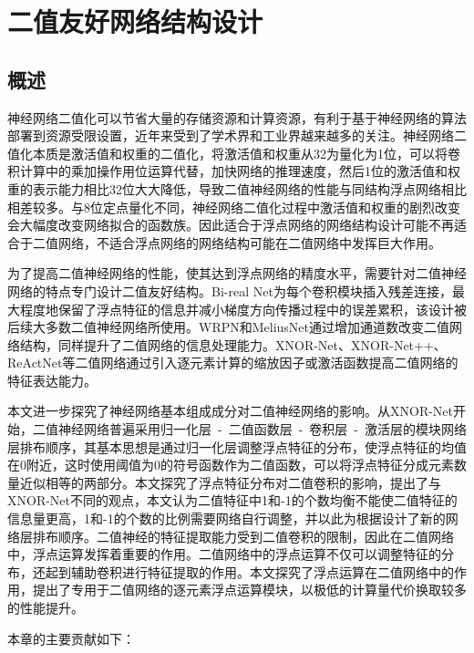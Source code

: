 
\chapter{二值友好网络结构设计}

\section{概述}

神经网络二值化可以节省大量的存储资源和计算资源，有利于基于神经网络的算法部署到资源受限设置，近年来受到了学术界和工业界越来越多的关注。神经网络二值化本质是激活值和权重的二值化，将激活值和权重从32为量化为1位，可以将卷积计算中的乘加操作用位运算代替，加快网络的推理速度，然后1位的激活值和权重的表示能力相比32位大大降低，导致二值神经网络的性能与同结构浮点网络相比相差较多。与8位定点量化不同，神经网络二值化过程中激活值和权重的剧烈改变会大幅度改变网络拟合的函数族。因此适合于浮点网络的网络结构设计可能不再适合于二值网络，不适合浮点网络的网络结构可能在二值网络中发挥巨大作用。

为了提高二值神经网络的性能，使其达到浮点网络的精度水平，需要针对二值神经网络的特点专门设计二值友好结构。Bi-real Net\cite{birealnet}为每个卷积模块插入残差连接，最大程度地保留了浮点特征的信息并减小梯度方向传播过程中的误差累积，该设计被后续大多数二值神经网络所使用。WRPN\cite{wrpn}和MeliusNet\cite{meliusnet}通过增加通道数改变二值网络结构，同样提升了二值网络的信息处理能力。XNOR-Net\cite{xnornet}、XNOR-Net++\cite{xnornet++}、ReActNet\cite{reactnet}等二值网络通过引入逐元素计算的缩放因子或激活函数提高二值网络的特征表达能力。

本文进一步探究了神经网络基本组成成分对二值神经网络的影响。从XNOR-Net\cite{xnornet}开始，二值神经网络普遍采用归一化层\ -\ 二值函数层\ -\ 卷积层\ -\ 激活层的模块网络层排布顺序，其基本思想是通过归一化层调整浮点特征的分布，使浮点特征的均值在0附近，这时使用阈值为0的符号函数作为二值函数，可以将浮点特征分成元素数量近似相等的两部分。本文探究了浮点特征分布对二值卷积的影响，提出了与XNOR-Net不同的观点，本文认为二值特征中1和-1的个数均衡不能使二值特征的信息量更高，1和-1的个数的比例需要网络自行调整，并以此为根据设计了新的网络层排布顺序。二值神经的特征提取能力受到二值卷积的限制，因此在二值网络中，浮点运算发挥着重要的作用。二值网络中的浮点运算不仅可以调整特征的分布，还起到辅助卷积进行特征提取的作用。本文探究了浮点运算在二值网络中的作用，提出了专用于二值网络的逐元素浮点运算模块，以极低的计算量代价换取较多的性能提升。

本章的主要贡献如下：


